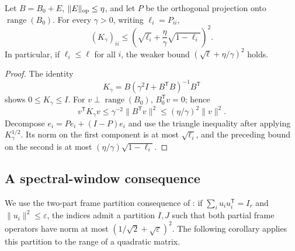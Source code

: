 \begin{lemma}\label{four:ridge-stability}
Let \(B=B_0+E\), \(\|E\|_{\rm op}\leq\eta\), and let \(P\)
be the orthogonal projection onto \(\operatorname{range}(B_0)\).
For every \(\gamma>0\), writing \(\ell_i=P_{ii}\),
\begin{equation}\label{four:ridge-stability-bound}
 (K_\gamma)_{ii}
 \leq\left(\sqrt{\ell_i}
          +\frac{\eta}{\gamma}\sqrt{1-\ell_i}\right)^2.
\end{equation}
In particular, if \(\ell_i\leq\ell\) for all \(i\), the weaker
bound \((\sqrt\ell+\eta/\gamma)^2\) holds.
\end{lemma}
\begin{proof}
The identity
\[
 K_\gamma
 =B(\gamma^2I+B^{\mathsf T}B)^{-1}B^{\mathsf T}
\]
shows \(0\leq K_\gamma\leq I\).
For \(v\perp\operatorname{range}(B_0)\), \(B_0^{\mathsf T}v=0\);
hence
\[
 v^{\mathsf T}K_\gamma v
 \leq\gamma^{-2}\|B^{\mathsf T}v\|^2
 \leq(\eta/\gamma)^2\|v\|^2.
\]
Decompose \(e_i=Pe_i+(I-P)e_i\) and use the triangle inequality
after applying \(K_\gamma^{1/2}\).  Its norm on the first
component is at most \(\sqrt{\ell_i}\), and the preceding
bound on the second is at most
\((\eta/\gamma)\sqrt{1-\ell_i}\).
\end{proof}

\subsection{A spectral-window consequence}

We use the two-part frame partition consequence of
\citet[Corollary 1.5]{MSS2015}: if
\(\sum_i u_iu_i^{\mathsf T}=I_r\) and
\(\|u_i\|^2\leq\varepsilon\), the indices admit a partition
\(I,J\) such that both partial frame operators have norm at most
\((1/\sqrt2+\sqrt\varepsilon)^2\).
The following corollary applies this partition to the range of a
quadratic matrix.

